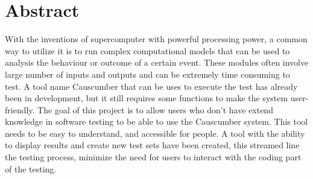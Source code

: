\chapter*{\Large \center Abstract}

With the inventions of supercomputer with powerful processing power, a common way to utilize it is to run complex computational models that can be used to analysis the behaviour or outcome of a certain event. These modules often involve large number of inputs and outputs and can be extremely time consuming to test. A tool name Causcumber that can be uses to execute the test has already been in development, but it still requires some functions to make the system user-friendly. The goal of this project is to allow users who don’t have extend knowledge in software testing to be able to use the Causcumber system. This tool needs to be easy to understand, and accessible for people.
A tool with the ability to display results and create new
test sets have been created, this streamed line the testing process, minimize the need for users to interact with the coding part of the testing.


